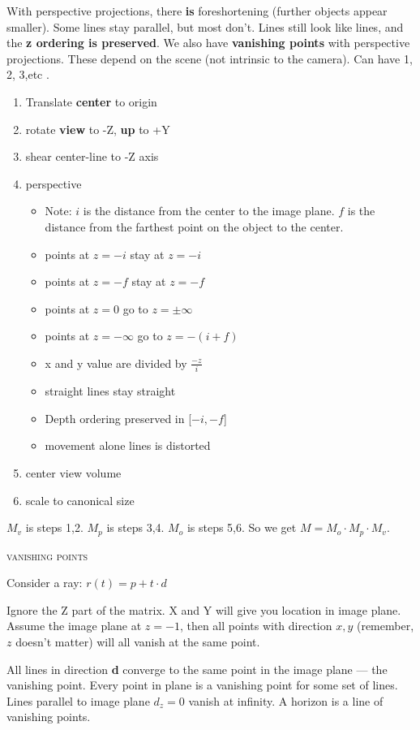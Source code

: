 \documentclass{article}
\begin{document}
With perspective projections, there {\bf is} foreshortening (further objects appear smaller). Some lines stay parallel, but most don't. Lines still look like lines, and the {\bf z ordering is preserved}. We also have {\bf vanishing points} with perspective projections. These depend on the scene (not intrinsic to the camera). Can have 1, 2, 3,etc .
\begin{enumerate}
	\item Translate {\bf center}  to origin
	\item rotate {\bf view} to -Z, {\bf up} to +Y
	\item shear center-line to -Z axis
	\item perspective
	\begin{itemize}
		\item Note: $i$ is the distance from the center to the image plane. $f$ is the distance from the farthest point on the object to the center.
		\item points at $z=-i$ stay at $z=-i$
		\item points at $z=-f$ stay at $z=-f$
		\item points at $z=0$ go to $z=\pm\infty$
		\item points at $z=-\infty$ go to $z=-(i+f)$
		\item x and y value are divided by $\frac{-z}{i} $
		\item straight lines stay straight
		\item Depth ordering preserved in [$-i,-f$]
		\item movement alone lines is distorted
	\end{itemize}
	\item center view volume
	\item scale to canonical size
\end{enumerate}
$M_v$ is steps 1,2. $M_p$ is steps 3,4. $M_o$ is steps 5,6. So we get $M=M_o\cdot M_p\cdot M_v$.

\begin{center}\textsc{vanishing points}\end{center} 
Consider a ray: $r(t)=p+t\cdot d$

Ignore the Z part of the matrix. X and Y will give you location in image plane. Assume the image plane at $z=-1$, then all points with direction $x,y$ (remember, $z$ doesn't matter) will all vanish at the same point. 

All lines in direction {\bf d} converge to the same point in the image plane --- the vanishing point. Every point in plane is a vanishing point for some set of lines. Lines parallel to image plane $d_z=0$ vanish at infinity. A horizon is a line of vanishing points.
\end{document}
